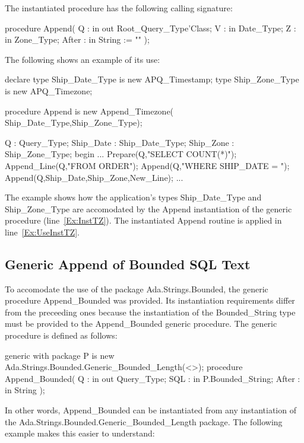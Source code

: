 \documentclass[english,letterpaper]{book}
\begin{document}
The instantiated procedure has the following calling signature:

\begin{Code}
procedure Append(
   Q :     in out Root_Query_Type'Class;
   V :     in     Date_Type;
   Z :     in     Zone_Type;
   After : in     String := ""
);
\end{Code}

The following shows an example of its use:

\begin{NumberedExample}
declare
   type Ship_Date_Type is new APQ_Timestamp;
   type Ship_Zone_Type is new APQ_Timezone;

   procedure Append is new Append_Timezone(\label{Ex:InstTZ}
      Ship_Date_Type,Ship_Zone_Type);

   Q :         Query_Type;
   Ship_Date : Ship_Date_Type;
   Ship_Zone : Ship_Zone_Type;
begin
   ...
   Prepare(Q,"SELECT COUNT(*)");
   Append_Line(Q,"FROM ORDER");
   Append(Q,"WHERE SHIP_DATE = ");
   Append(Q,Ship_Date,Ship_Zone,New_Line);\label{Ex:UseInstTZ}
   ...
\end{NumberedExample}

The example shows how the application's types Ship\_Date\_Type
and Ship\_Zone\_Type are accomodated by the Append instantiation
of the generic procedure (line~\ref{Ex:InstTZ}). The instantiated
Append routine is applied in line~\ref{Ex:UseInstTZ}.


\subsection{Generic Append of Bounded SQL Text}

To accomodate the use of the package Ada\-.Strings\-.Bounded,
the generic procedure Append\_Bounded was provided. Its instantiation
requirements differ from the preceeding ones because the instantiation
of the Bounded\_String type must be provided to the Append\_Bounded
generic procedure. The generic procedure is defined as follows:

\begin{Code}
generic
   with package P 
      is new Ada.Strings.Bounded.Generic_Bounded_Length(<>);
procedure Append_Bounded(
   Q :     in out Query_Type;
   SQL :   in     P.Bounded_String;
   After : in     String
);
\end{Code}

In other words, Append\_Bounded can be instantiated from any instantiation
of the Ada.Strings.Bounded.Generic\_Bounded\_Length package. The following
example makes this easier to understand:
\end{document}
